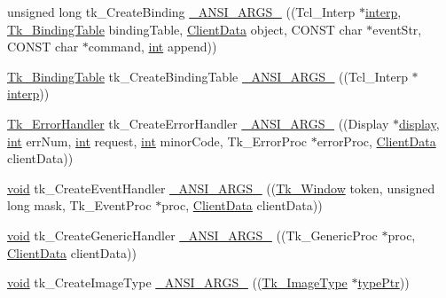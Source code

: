 \begin{DoxyCompactItemize}
\item 
unsigned long tk\+\_\+\+Create\+Binding \hyperlink{struct_tk_stubs_a2e676bf26bea7c3c85c438f33ae335d2}{\+\_\+\+A\+N\+S\+I\+\_\+\+A\+R\+G\+S\+\_\+} ((Tcl\+\_\+\+Interp $\ast$\hyperlink{tk_8h_a5ab79c0f5849ee8e6a2e955a6c536cc0}{interp}, \hyperlink{tk_8h_aba3b4bb6109d20b6e4bf79b230f23566}{Tk\+\_\+\+Binding\+Table} binding\+Table, \hyperlink{tk_8h_accf84b4d725a8f41e04d6333768a6001}{Client\+Data} object, C\+O\+N\+ST char $\ast$event\+Str, C\+O\+N\+ST char $\ast$command, \hyperlink{tk_8h_a83f82f76e7fed06f4c49d2db94028a6d}{int} append))
\item 
\hyperlink{tk_8h_aba3b4bb6109d20b6e4bf79b230f23566}{Tk\+\_\+\+Binding\+Table} tk\+\_\+\+Create\+Binding\+Table \hyperlink{struct_tk_stubs_a339154f1d0dad10279cbc9c24b6b74d9}{\+\_\+\+A\+N\+S\+I\+\_\+\+A\+R\+G\+S\+\_\+} ((Tcl\+\_\+\+Interp $\ast$\hyperlink{tk_8h_a5ab79c0f5849ee8e6a2e955a6c536cc0}{interp}))
\item 
\hyperlink{tk_8h_a928c3fe7035efef54a033adeab316a46}{Tk\+\_\+\+Error\+Handler} tk\+\_\+\+Create\+Error\+Handler \hyperlink{struct_tk_stubs_a3beddea9f5d7faf604a3c3e12598c5b9}{\+\_\+\+A\+N\+S\+I\+\_\+\+A\+R\+G\+S\+\_\+} ((Display $\ast$\hyperlink{tk_8h_afc08b650bd5c7e58f8133cc830a2ef84}{display}, \hyperlink{tk_8h_a83f82f76e7fed06f4c49d2db94028a6d}{int} err\+Num, \hyperlink{tk_8h_a83f82f76e7fed06f4c49d2db94028a6d}{int} request, \hyperlink{tk_8h_a83f82f76e7fed06f4c49d2db94028a6d}{int} minor\+Code, Tk\+\_\+\+Error\+Proc $\ast$error\+Proc, \hyperlink{tk_8h_accf84b4d725a8f41e04d6333768a6001}{Client\+Data} client\+Data))
\item 
\hyperlink{tk_8h_aba408b7cd755a96426e004c015f5de8e}{void} tk\+\_\+\+Create\+Event\+Handler \hyperlink{struct_tk_stubs_a10c82780e8c52162c180c93222b0d215}{\+\_\+\+A\+N\+S\+I\+\_\+\+A\+R\+G\+S\+\_\+} ((\hyperlink{tk_8h_ab756137de3ee74edc2501bd0d761e37c}{Tk\+\_\+\+Window} token, unsigned long mask, Tk\+\_\+\+Event\+Proc $\ast$proc, \hyperlink{tk_8h_accf84b4d725a8f41e04d6333768a6001}{Client\+Data} client\+Data))
\item 
\hyperlink{tk_8h_aba408b7cd755a96426e004c015f5de8e}{void} tk\+\_\+\+Create\+Generic\+Handler \hyperlink{struct_tk_stubs_a0fe98d42aa707076041191c822cf1d50}{\+\_\+\+A\+N\+S\+I\+\_\+\+A\+R\+G\+S\+\_\+} ((Tk\+\_\+\+Generic\+Proc $\ast$proc, \hyperlink{tk_8h_accf84b4d725a8f41e04d6333768a6001}{Client\+Data} client\+Data))
\item 
\hyperlink{tk_8h_aba408b7cd755a96426e004c015f5de8e}{void} tk\+\_\+\+Create\+Image\+Type \hyperlink{struct_tk_stubs_abf5f8279cab44217401edb704c66da0b}{\+\_\+\+A\+N\+S\+I\+\_\+\+A\+R\+G\+S\+\_\+} ((\hyperlink{struct_tk___image_type}{Tk\+\_\+\+Image\+Type} $\ast$\hyperlink{tk_8h_aa93ff76198031a582cbff2fad6d80ca6}{type\+Ptr}))

\end{DoxyCompactItemize}
